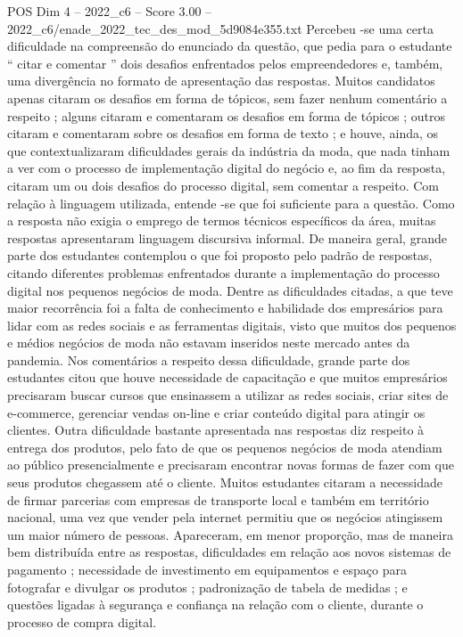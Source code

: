 \begin{textsample}{POS Dim 4 – 2022\_c6 – Score 3.00 – 2022\_c6/enade\_2022\_tec\_des\_mod\_5d9084e355.txt}
Percebeu -se uma certa dificuldade na compreensão do enunciado da questão, que pedia para o estudante “ citar e comentar ” dois desafios enfrentados pelos empreendedores e, também, uma divergência no formato de apresentação das respostas.
Muitos candidatos apenas citaram os desafios em forma de tópicos, sem fazer nenhum comentário a respeito ; alguns citaram e comentaram os desafios em forma de tópicos ; outros citaram e comentaram sobre os desafios em forma de texto ; e houve, ainda, os que contextualizaram dificuldades gerais da indústria da moda, que nada tinham a ver com o processo de implementação digital do negócio e, ao fim da resposta, citaram um ou dois desafios do processo digital, sem comentar a respeito.
Com relação à linguagem utilizada, entende -se que foi suficiente para a questão.
Como a resposta não exigia o emprego de termos técnicos específicos da área, muitas respostas apresentaram linguagem discursiva informal.
De maneira geral, grande parte dos estudantes contemplou o que foi proposto pelo padrão de respostas, citando diferentes problemas enfrentados durante a implementação do processo digital nos pequenos negócios de moda.
Dentre as dificuldades citadas, a que teve maior recorrência foi a falta de conhecimento e habilidade dos empresários para lidar com as redes sociais e as ferramentas digitais, visto que muitos dos pequenos e médios negócios de moda não estavam inseridos neste mercado antes da pandemia.
Nos comentários a respeito dessa dificuldade, grande parte dos estudantes citou que houve necessidade de capacitação e que muitos empresários precisaram buscar cursos que ensinassem a utilizar as redes sociais, criar sites de e-commerce, gerenciar vendas on-line e criar conteúdo digital para atingir os clientes.
Outra dificuldade bastante apresentada nas respostas diz respeito à entrega dos produtos, pelo fato de que os pequenos negócios de moda atendiam ao público presencialmente e precisaram encontrar novas formas de fazer com que seus produtos chegassem até o cliente.
Muitos estudantes citaram a necessidade de firmar parcerias com empresas de transporte local e também em território nacional, uma vez que vender pela internet permitiu que os negócios atingissem um maior número de pessoas.
Apareceram, em menor proporção, mas de maneira bem distribuída entre as respostas, dificuldades em relação aos novos sistemas de pagamento ; necessidade de investimento em equipamentos e espaço para fotografar e divulgar os produtos ; padronização de tabela de medidas ; e questões ligadas à segurança e confiança na relação com o cliente, durante o processo de compra digital.

\end{textsample}
